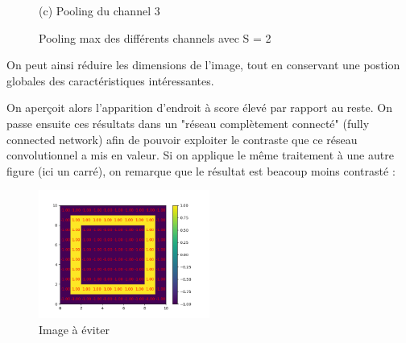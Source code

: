 \begin{figure}[h]
        \center
        (c) Pooling du channel 3
    \endminipage
    \caption{Pooling max des différents channels avec S = 2}
\end{figure}

On peut ainsi réduire les dimensions de l'image, tout en conservant une postion globales des caractéristiques intéressantes.

On aperçoit alors l'apparition d'endroit à score élevé par rapport au reste.
On passe ensuite ces résultats dans un "réseau complètement connecté" (fully connected network) 
afin de pouvoir exploiter le contraste que ce réseau convolutionnel a mis en valeur.
Si on applique le même traitement à une autre figure (ici un carré), on remarque que le résultat est beacoup moins contrasté : 

\begin{figure}[h]
    \center
    \includegraphics[width=0.5\textwidth]{img/cnn_exemple/square/image_carre.png}
    \caption{Image à éviter}
\end{figure}



